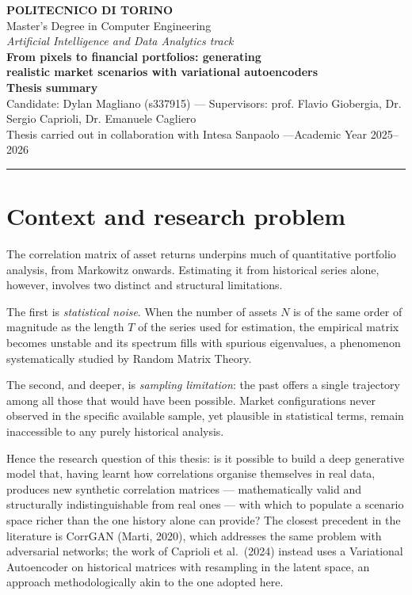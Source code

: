 \documentclass[11pt,a4paper]{article}
\begin{document}
\begin{center}
  {\Large\bfseries\color{polito} POLITECNICO DI TORINO}\\[0.35em]
  {\normalsize Master's Degree in Computer Engineering}\\
  {\small\itshape Artificial Intelligence and Data Analytics track}\\[1.1em]
  {\large\bfseries From pixels to financial portfolios: generating\\
   realistic market scenarios with variational autoencoders}\\[0.7em]
  {\normalsize\bfseries Thesis summary}\\[0.5em]
  {\small Candidate: Dylan Magliano (s337915) \quad---\quad
   Supervisors: prof. Flavio Giobergia, Dr. Sergio Caprioli,
   Dr. Emanuele Cagliero}\\
  {\small Thesis carried out in collaboration with Intesa Sanpaolo
   \quad---\quad Academic Year 2025--2026}
\end{center}

\vspace{0.5em}
\noindent\textcolor{rulegray}{\rule{\textwidth}{0.8pt}}

\section{Context and research problem}

The correlation matrix of asset returns underpins much of quantitative
portfolio analysis, from Markowitz onwards. Estimating it from historical
series alone, however, involves two distinct and structural limitations.

The first is \emph{statistical noise}. When the number of assets $N$ is of the
same order of magnitude as the length $T$ of the series used for estimation,
the empirical matrix becomes unstable and its spectrum fills with spurious
eigenvalues, a phenomenon systematically studied by Random Matrix Theory.

The second, and deeper, is \emph{sampling limitation}: the past offers a single
trajectory among all those that would have been possible. Market
configurations never observed in the specific available sample, yet
plausible in statistical terms, remain inaccessible to any purely historical
analysis.

Hence the research question of this thesis: is it possible to build a deep
generative model that, having learnt how correlations organise themselves in
real data, produces new synthetic correlation matrices --- mathematically
valid and structurally indistinguishable from real ones --- with which to
populate a scenario space richer than the one history alone can provide? The
closest precedent in the literature is CorrGAN (Marti, 2020), which addresses
the same problem with adversarial networks; the work of Caprioli et al.\
(2024) instead uses a Variational Autoencoder on historical matrices with
resampling in the latent space, an approach methodologically akin to the one
adopted here.
\end{document}
